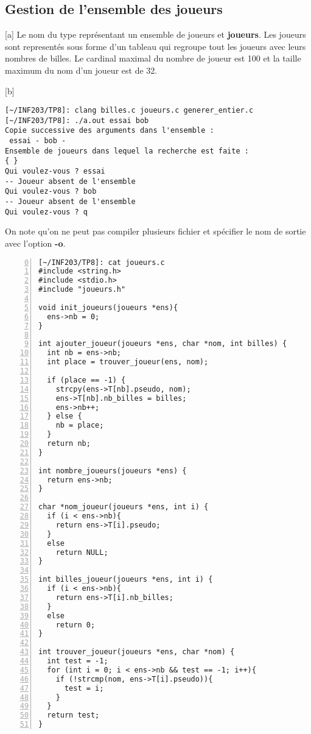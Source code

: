 \documentclass[12pt,a4paper,notitlepage,colorinlistoftodos]{article}
\begin{document}

\subsection*{Gestion de l’ensemble des joueurs}


[a]
Le nom du type représentant un ensemble de joueurs et \textbf{joueurs}.
Les joueurs sont representés sous forme d'un tableau qui regroupe tout les joueurs avec leurs nombres de billes.
Le cardinal maximal du nombre de joueur est 100 et la taille maximum du nom d'un joueur est de 32.


[b]
\begin{lstlisting}
[~/INF203/TP8]: clang billes.c joueurs.c generer_entier.c
[~/INF203/TP8]: ./a.out essai bob
Copie successive des arguments dans l'ensemble :
 essai - bob -
Ensemble de joueurs dans lequel la recherche est faite :
{ }
Qui voulez-vous ? essai
-- Joueur absent de l'ensemble
Qui voulez-vous ? bob 
-- Joueur absent de l'ensemble
Qui voulez-vous ? q
\end{lstlisting}

On note qu'on ne peut pas compiler plusieurs fichier et spécifier le nom de sortie avec l'option \textbf{-o}.

\newpage
[c]
\begin{lstlisting}[numbers=left, firstnumber = 0 ]
[~/INF203/TP8]: cat joueurs.c
#include <string.h>
#include <stdio.h>
#include "joueurs.h"

void init_joueurs(joueurs *ens){
  ens->nb = 0;
}

int ajouter_joueur(joueurs *ens, char *nom, int billes) {
  int nb = ens->nb;
  int place = trouver_joueur(ens, nom);

  if (place == -1) {
    strcpy(ens->T[nb].pseudo, nom);
    ens->T[nb].nb_billes = billes;
    ens->nb++;
  } else {
    nb = place;
  }
  return nb;
}

int nombre_joueurs(joueurs *ens) {
  return ens->nb;
}

char *nom_joueur(joueurs *ens, int i) {
  if (i < ens->nb){
    return ens->T[i].pseudo;
  }
  else
    return NULL;
}

int billes_joueur(joueurs *ens, int i) {
  if (i < ens->nb){
    return ens->T[i].nb_billes;
  }
  else
    return 0;
}

int trouver_joueur(joueurs *ens, char *nom) {
  int test = -1;
  for (int i = 0; i < ens->nb && test == -1; i++){
    if (!strcmp(nom, ens->T[i].pseudo)){
      test = i;
    }
  }
  return test;
}
\end{lstlisting}
\end{document}
